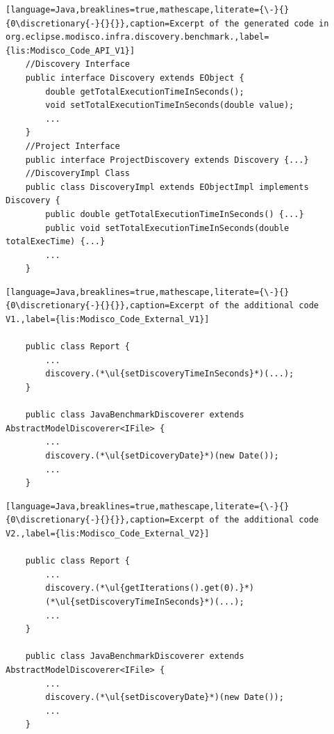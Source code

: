 \begin{lstlisting}[language=Java,breaklines=true,mathescape,literate={\-}{}{0\discretionary{-}{}{}},caption=Excerpt of the generated code in org.eclipse.modisco.infra.discovery.benchmark.,label={lis:Modisco_Code_API_V1}]
	//Discovery Interface
	public interface Discovery extends EObject {
		double getTotalExecutionTimeInSeconds();
		void setTotalExecutionTimeInSeconds(double value);
		...
	}
	//Project Interface
	public interface ProjectDiscovery extends Discovery {...}
	//DiscoveryImpl Class
	public class DiscoveryImpl extends EObjectImpl implements Discovery {
		public double getTotalExecutionTimeInSeconds() {...}
		public void setTotalExecutionTimeInSeconds(double totalExecTime) {...}
		...
	}
\end{lstlisting}
\begin{lstlisting}[language=Java,breaklines=true,mathescape,literate={\-}{}{0\discretionary{-}{}{}},caption=Excerpt of the additional code V1.,label={lis:Modisco_Code_External_V1}]
	
	public class Report {
		...
		discovery.(*\ul{setDiscoveryTimeInSeconds}*)(...);
	}
	
	public class JavaBenchmarkDiscoverer extends AbstractModelDiscoverer<IFile> {
		...
		discovery.(*\ul{setDicoveryDate}*)(new Date());
		...
	} 
\end{lstlisting}


\begin{lstlisting}[language=Java,breaklines=true,mathescape,literate={\-}{}{0\discretionary{-}{}{}},caption=Excerpt of the additional code V2.,label={lis:Modisco_Code_External_V2}]
	
	public class Report {
		...
		discovery.(*\ul{getIterations().get(0).}*) 
		(*\ul{setDiscoveryTimeInSeconds}*)(...);
		...
	}
	
	public class JavaBenchmarkDiscoverer extends AbstractModelDiscoverer<IFile> {
		...
		discovery.(*\ul{setDiscoveryDate}*)(new Date());
		...
	}
\end{lstlisting}





